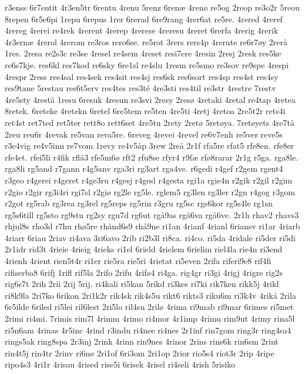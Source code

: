 {r3enss
6r7entit
4r3en5tr
6rentu
4renu
5renz
6renæ
4renø
re5og
2reop
re3o2r
5reou
8repen
6r5e6pi
1repu
6repus
1rer
6rerad
6re9rang
4rer6at
re5re.
4rered
4reref
4rereg
4rerei
re4rek
4rerent
4rerep
4rerese
4reresu
4reret
6rerfa
4rerig
4rerik
4r3ernæ
4rerol
4rerom
re3ros
rero6se.
re5rot
3rers
rers4p
4rerute
re6r7øy
2rerå
1res.
2resa
re2s3c
re3se
4resel
re4sem
4reset
resi7ere
4resin
2resj
2resk
res5ke
re6s7kje.
res6kl
res7kod
re6sky
6re1sl
re4slu
1resm
re5smo
re3sov
re9spe
4respi
4respr
2ress
res4sal
res4sek
res4sit
res4sj
res6sk
res6sort
res4sp
res4st
res4sy
res9tane
5restau
res6t5erv
res4tes
res3té
4re3sti
res4til
re3str
4restre
7restv
4re5sty
4restå
1resu
6resuk
4resun
re3svi
2resy
2resø
4retaki
4retal
re4tap
4retea
8retek.
6reteke
4retekn
6retel
6re5tem
re5ten
4re5ti
4retj
4retoa
2re5t2r
rets4i
ret4st
ret7ted
ret5ter
rett8o
rett6set
4re5tu
2rety
2retø
5retøya.
7retøyets
4re7tå
2reu
reu6r
4revak
re5van
reva5re.
6reveg
4revei
4revel
re6v7enh
re5ver
reve5s
r3e4vig
re4v5inn
re7vom
1revy
re4v5åp
3rew
2reå
2r1f
rfa5re
rfat5
rfe8en.
rfe8er
rfe4et.
rfei5li
r4fik
rflå3
rfe5m6ø
rft2
rfu8se
rfyr4
r9fæ
rfø8rarar
2r1g
r5ga.
rga8le.
rga8li
rg5and
r7gann
r4g5anv
rga3ri
rg3art
rga4ve.
r6gedi
r4gef
r2gem
rgent4
r3geo
r4gerei
r4geret
r4ge3ru
r4gesj
r4gesl
r4gesta
rgi1a
rgie4n
r2gik
r2gil
r2gim
r2gio
r2gir
rg3i4ri
rgi7sl
r2giø
rg2le
rg5le.
rglem5
rg3len
rg3ler
r2gn
r4gog
r3gom
r2got
rg5rab
rg3rea
rg3rel
rg5reps
rg5rin
r3gru
rg5sc
rgs6kor
rg5s4le
rg1sn
rg5s6till
rg5sto
rg9stu
rg2sy
rgu7d
rg6ut
rgå9as
rgå6va
rgå6ve.
2r1h
rhav2
rhavs3
rhjul8s
rho3d
r7hu
rhø5re
rhånd6s9
rhå9ne
ri1an
4rianf
4rianl
6riansv
ri1ar
4riarb
4riarr
6riau
2riav
ri4ava
3ri6avo
2rib
ri2b3l
ri8ca.
ri4co.
ri5da
4ridale
ri5der
ri5di
2r1idr
rid3t
4rieie
4rieig
4rieks
ri1el
6rield
4rielem
6rielim
riel4la
rie4n
ri3end
4rienh
4rient
rien5t4r
ri1er
rie5ra
rie5ri
4rietat
ri5even
2rifa
riferi9e8
rif4fi
rifiserba8
6rifj
1rifl
rif5la
2rifo
2rifu
4rifø4
ri4ga.
rig4gr
ri3gi
4rigj
4rigre
rig2s
rig6s7t
2rih
2rii
2rij
5rij.
ri4kali
ri5kan
5rikd
ri3kes
ri7ki
rik7ken
rikk5j
4rikl
ri8k9la
2ri7ko
6rikon
2ri1k2r
rik4sk
rik4s5u
rikt6
rikts3
riku6m
ri3k4v
4rikå
2rila
6r5ilde
6riled
ri5lei
ril6lest
2ri5lo
ril4sn
2rilø
4rima
ri9mab
ri9mar
6rimes
ri5met
2rimi
ri4mi.
7rimis
rim7l
4rimm
4rimo
ri4mor
4r1imp
4rimu
rim9ut
4rimy
rina5l
ri5n6am
4rinas
4r5inc
4rind
r3indu
ri4nee
ri4nes
2r1inf
rin7gom
ring3r
ring4sa4
rings5ak
ring8spa
2r3inj
2rink
4rinn
rin9nes
4rinor
2rins
rins6k
rin6sm
2rint
rin4t5j
rin4tr
2rinv
ri6nø
2ri1of
6ri3om
2ri1op
2rior
rio5s4
riot3r
2rip
4ripe
ripo4s3
4ri1r
4risau
4rised
rise5i
6risek
4risel
ri4seli
4rish
5risiko
}
